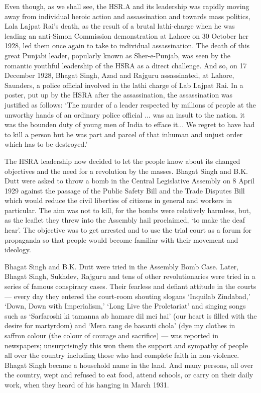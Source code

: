 Even though, as we shall see, the HSR.A and its leadership was rapidly moving away from individual heroic action and assassination and towards mass politics, Lala Lajpat Rai's death, as the result of a brutal lathi-charge when he was leading an anti-Simon Commission demonstration at Lahore on 30 October her 1928, led them once again to take to individual assassination. The death of this great Punjabi leader, popularly known as Sher-e-Punjab, was seen by the romantic youthful leadership of the HSRA as a direct challenge. And so, on 17 December 1928, Bhagat Singh, Azad and Rajguru assassinated, at Lahore, Saunders, a police official involved in the lathi charge of Lab Lajpat Rai. In a poster, put up by the HSRA after the assassination, the assassination was justified as follows: `The murder of a leader respected by millions of people at the unworthy hands of an ordinary police official ... was an insult to the nation. it was the bounden duty of young men of India to efface it... We regret to have had to kill a person but he was part and parcel of that inhuman and unjust order which has to be destroyed.'

The HSRA leadership now decided to let the people know about its changed objectives and the need for a revolution by the masses. Bhagat Singh and B.K. Dutt were asked to throw a bomb in the Central Legislative Assembly on 8 April 1929 against the passage of the Public Safety Bill and the Trade Disputes Bill which would reduce the civil liberties of citizens in general and workers in particular. The aim was not to kill, for the bombs were relatively harmless, but, as the leaflet they threw into the Assembly hail proclaimed, `to make the deaf hear'. The objective was to get arrested and to use the trial court as a forum for propaganda so that people would become familiar with their movement and ideology.

Bhagat Singh and B.K. Dutt were tried in the Assembly Bomb Case. Later, Bhagat Singh, Sukhdev, Rajguru and tens of other revolutionaries were tried in a series of famous conspiracy cases. Their fearless and defiant attitude in the courts --- every day they entered the court-room shouting slogans `Inquilab Zindabad,' `Down, Down with Imperialism,' `Long Live the Proletariat' and singing songs such as `Sarfaroshi ki tamanna ab hamare dil mei hai' (our heart is filled with the desire for martyrdom) and `Mera rang de basanti chola' (dye my clothes in saffron colour (the colour of courage and sacrifice) --- was reported in newspapers; unsurprisingly this won them the support and sympathy of people all over the country including those who had complete faith in non-violence. Bhagat Singh became a household name in the land. And many persons, all over the country, wept and refused to eat food, attend schools, or carry on their daily work, when they heard of his hanging in March 1931.

